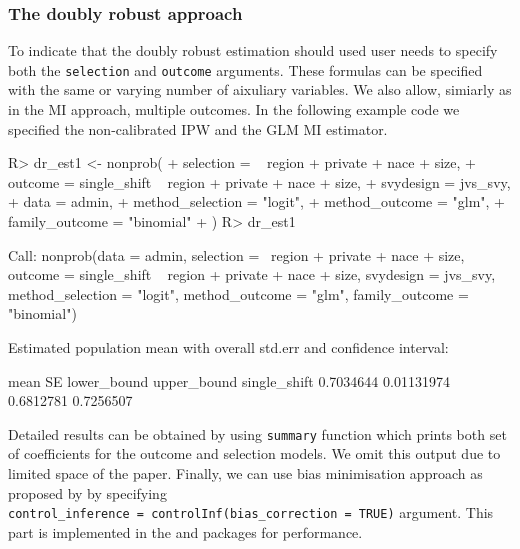 \documentclass[
]{jss}
\begin{document}
\subsubsection{The doubly robust
approach}\label{the-doubly-robust-approach}

To indicate that the doubly robust estimation should used user needs to
specify both the \texttt{selection} and \texttt{outcome} arguments.
These formulas can be specified with the same or varying number of
aixuliary variables. We also allow, simiarly as in the MI approach,
multiple outcomes. In the following example code we specified the
non-calibrated IPW and the GLM MI estimator.

\begin{CodeChunk}
\begin{CodeInput}
R> dr_est1 <- nonprob(
+   selection = ~ region + private + nace + size,
+   outcome = single_shift ~ region + private + nace + size,
+   svydesign = jvs_svy,
+   data = admin,
+   method_selection = "logit",
+   method_outcome = "glm",
+   family_outcome = "binomial"
+ )
R> dr_est1
\end{CodeInput}
\begin{CodeOutput}

Call:
nonprob(data = admin, selection = ~region + private + nace + 
    size, outcome = single_shift ~ region + private + nace + 
    size, svydesign = jvs_svy, method_selection = "logit", method_outcome = "glm", 
    family_outcome = "binomial")

Estimated population mean with overall std.err and confidence interval:

                  mean         SE lower_bound upper_bound
single_shift 0.7034644 0.01131974   0.6812781   0.7256507
\end{CodeOutput}
\end{CodeChunk}

Detailed results can be obtained by using \texttt{summary} function
which prints both set of coefficients for the outcome and selection
models. We omit this output due to limited space of the paper. Finally,
we can use bias minimisation approach as proposed by
\citet{yang_doubly_2020} by specifying
\texttt{control\_inference\ =\ controlInf(bias\_correction\ =\ TRUE)}
argument. This part is implemented in the  \citep{Rcpp} and
 \citep{RcppArmadillo} packages for performance.
\end{document}
